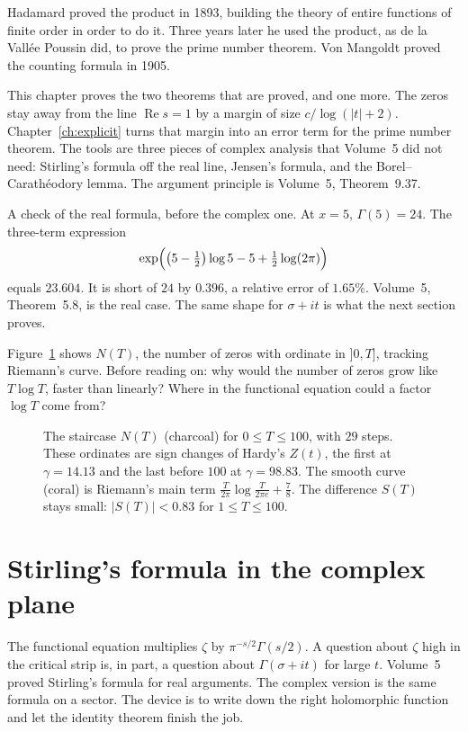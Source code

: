 Hadamard proved the product in 1893, building the theory of entire functions of finite order in order to do it. Three years later he used the product, as de la Vallée Poussin did, to prove the prime number theorem. Von Mangoldt proved the counting formula in 1905.

This chapter proves the two theorems that are proved, and one more. The zeros stay away from the line $\operatorname{Re}s=1$ by a margin of size $c/\log(|t|+2)$. Chapter~\ref{ch:explicit} turns that margin into an error term for the prime number theorem. The tools are three pieces of complex analysis that Volume~5 did not need: Stirling's formula off the real line, Jensen's formula, and the Borel--Carathéodory lemma. The argument principle is Volume~5, Theorem~9.37.

A check of the real formula, before the complex one. At $x=5$, $\Gamma(5)=24$. The three-term expression
\[
\exp\Bigl(\bigl(5-\tfrac12\bigr)\log5-5+\tfrac12\log(2\pi)\Bigr)
\]
equals $23.604$. It is short of $24$ by $0.396$, a relative error of $1.65\%$. Volume~5, Theorem~5.8, is the real case. The same shape for $\sigma+it$ is what the next section proves.

\begin{think}
Figure~\ref{fig:nt} shows $N(T)$, the number of zeros with ordinate in $]0,T]$, tracking Riemann's curve. Before reading on: why would the number of zeros grow like $T\log T$, faster than linearly? Where in the functional equation could a factor $\log T$ come from?
\end{think}

\begin{figure}[ht]
\centering
{}
\caption{The staircase $N(T)$ (charcoal) for $0\le T\le100$, with $29$ steps. These ordinates are sign changes of Hardy's $Z(t)$, the first at $\gamma=14.13$ and the last before $100$ at $\gamma=98.83$. The smooth curve (coral) is Riemann's main term $\frac T{2\pi}\log\frac T{2\pi e}+\frac78$. The difference $S(T)$ stays small: $|S(T)|<0.83$ for $1\le T\le100$.}
\label{fig:nt}
\end{figure}

\section{Stirling's formula in the complex plane}

The functional equation multiplies $\zeta$ by $\pi^{-s/2}\Gamma(s/2)$. A question about $\zeta$ high in the critical strip is, in part, a question about $\Gamma(\sigma+it)$ for large $t$. Volume~5 proved Stirling's formula for real arguments. The complex version is the same formula on a sector. The device is to write down the right holomorphic function and let the identity theorem finish the job.

